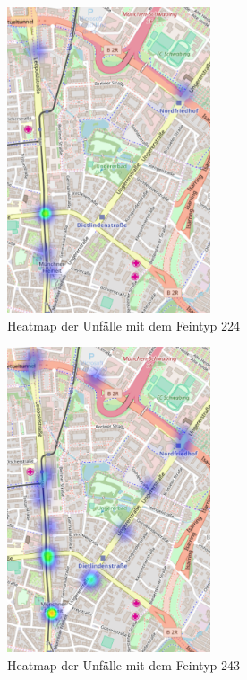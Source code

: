 \begin{savenotes}
	\begin{figure}[H]
		\centering
		\includegraphics[width=6cm,height=9cm]{figures/HM_224}
		\caption[Heatmap der Unfälle mit dem Feintyp 224]{Heatmap der Unfälle mit dem Feintyp 224}\label{fig:Heatmap_224}
	\end{figure}
\end{savenotes}

\begin{savenotes}
	\begin{figure}[H]
		\centering
		\includegraphics[width=6cm,height=9cm]{figures/HM_243}
		\caption[Heatmap der Unfälle mit dem Feintyp 243]{Heatmap der Unfälle mit dem Feintyp 243}\label{fig:Heatmap_243}
	\end{figure}
\end{savenotes}

